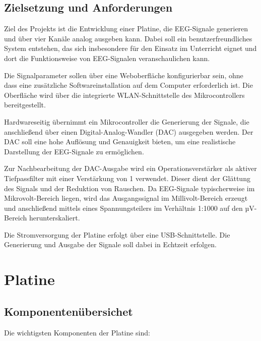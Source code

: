 \section{Zielsetzung und Anforderungen}

Ziel des Projekts ist die Entwicklung einer Platine, die EEG-Signale generieren und über vier Kanäle analog ausgeben kann. Dabei soll ein benutzerfreundliches System entstehen, das sich insbesondere für den Einsatz im Unterricht eignet und dort die Funktionsweise von EEG-Signalen veranschaulichen kann.

Die Signalparameter sollen über eine Weboberfläche konfigurierbar sein, ohne dass eine zusätzliche Softwareinstallation auf dem Computer erforderlich ist. Die Oberfläche wird über die integrierte WLAN-Schnittstelle des Mikrocontrollers bereitgestellt.

Hardwareseitig übernimmt ein Mikrocontroller die Generierung der Signale, die anschließend über einen Digital-Analog-Wandler (DAC) ausgegeben werden. Der DAC soll eine hohe Auflösung und Genauigkeit bieten, um eine realistische Darstellung der EEG-Signale zu ermöglichen.

Zur Nachbearbeitung der DAC-Ausgabe wird ein Operationsverstärker als aktiver Tiefpassfilter mit einer Verstärkung von 1 verwendet. Dieser dient der Glättung des Signals und der Reduktion von Rauschen. Da EEG-Signale typischerweise im Mikrovolt-Bereich liegen, wird das Ausgangssignal im Millivolt-Bereich erzeugt und anschließend mittels eines Spannungsteilers im Verhältnis 1:1000 auf den µV-Bereich herunterskaliert.

Die Stromversorgung der Platine erfolgt über eine USB-Schnittstelle. Die Generierung und Ausgabe der Signale soll dabei in Echtzeit erfolgen.

\chapter{Platine}

\section{Komponentenübersichet}

Die wichtigsten Komponenten der Platine sind:

